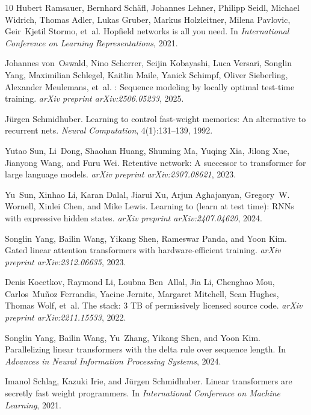 \documentclass{article}
\begin{document}
\begin{thebibliography}{10}
Hubert Ramsauer, Bernhard Sch{\"a}fl, Johannes Lehner, Philipp Seidl, Michael
  Widrich, Thomas Adler, Lukas Gruber, Markus Holzleitner, Milena Pavlovic,
  Geir~Kjetil Stormo, et~al.
\newblock Hopfield networks is all you need.
\newblock In \emph{International Conference on Learning Representations}, 2021.

Johannes von~Oswald, Nino Scherrer, Seijin Kobayashi, Luca Versari, Songlin Yang,
  Maximilian Schlegel, Kaitlin Maile, Yanick Schimpf, Oliver Sieberling,
  Alexander Meulemans, et~al.
: Sequence modeling by locally optimal test-time training.
\newblock \emph{arXiv preprint arXiv:2506.05233}, 2025.

J{\"u}rgen Schmidhuber.
\newblock Learning to control fast-weight memories: An alternative to recurrent
  nets.
\newblock \emph{Neural Computation}, 4(1):131--139, 1992.

Yutao Sun, Li~Dong, Shaohan Huang, Shuming Ma, Yuqing Xia, Jilong Xue,
  Jianyong Wang, and Furu Wei.
\newblock Retentive network: A successor to transformer for large language
  models.
\newblock \emph{arXiv preprint arXiv:2307.08621}, 2023.

Yu~Sun, Xinhao Li, Karan Dalal, Jiarui Xu, Arjun Aghajanyan, Gregory~W.
  Wornell, Xinlei Chen, and Mike Lewis.
\newblock Learning to (learn at test time): {RNN}s with expressive hidden
  states.
\newblock \emph{arXiv preprint arXiv:2407.04620}, 2024.

Songlin Yang, Bailin Wang, Yikang Shen, Rameswar Panda, and Yoon Kim.
\newblock Gated linear attention transformers with hardware-efficient training.
\newblock \emph{arXiv preprint arXiv:2312.06635}, 2023.

Denis Kocetkov, Raymond Li, Loubna Ben~Allal, Jia Li, Chenghao Mou,
  Carlos~Mu{\~n}oz Ferrandis, Yacine Jernite, Margaret Mitchell, Sean Hughes,
  Thomas Wolf, et~al.
\newblock The stack: 3 {TB} of permissively licensed source code.
\newblock \emph{arXiv preprint arXiv:2211.15533}, 2022.

Songlin Yang, Bailin Wang, Yu~Zhang, Yikang Shen, and Yoon Kim.
\newblock Parallelizing linear transformers with the delta rule over sequence length.
\newblock In \emph{Advances in Neural Information Processing Systems}, 2024.

Imanol Schlag, Kazuki Irie, and J{\"u}rgen Schmidhuber.
\newblock Linear transformers are secretly fast weight programmers.
\newblock In \emph{International Conference on Machine Learning}, 2021.

\end{thebibliography}
\end{document}
